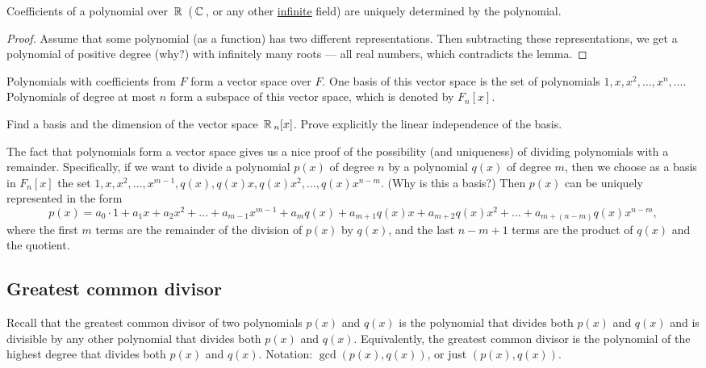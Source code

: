 \begin{corollary}
Coefficients of a polynomial over $\,\mathbb{R}\,$ ($\,\mathbb{C}\,$, or any other \underline{infinite} field) are uniquely determined by the polynomial.
\end{corollary}

\begin{proof}
Assume that some polynomial (as a function) has two different representations. Then subtracting these representations, we get a polynomial of positive degree (why?) with infinitely many roots --- all real numbers, which contradicts the lemma.
\end{proof}

Polynomials with coefficients from $F$ form a vector space over $F$. One basis of this vector space is the set of polynomials $1, x, x^2, \ldots, x^n, \ldots$. Polynomials of degree at most $n$ form a subspace of this vector space, which is denoted by $F_n[x]$.

\begin{exercise}
    Find a basis and the dimension of the vector space $\,\mathbb{R}\,_n[x]$. Prove explicitly the linear independence of the basis.
\end{exercise}

The fact that polynomials form a vector space gives us a nice proof of the possibility (and uniqueness) of dividing polynomials with a remainder. Specifically, if we want to divide a polynomial $p(x)$ of degree $n$ by a polynomial $q(x)$ of degree $m$, then we choose as a basis in $F_n[x]$ the set $1, x, x^2, \ldots, x^{m - 1}, q(x), q(x)x, q(x)x^2, \ldots, q(x)x^{n-m}$. (Why is this a basis?) Then $p(x)$ can be uniquely represented in the form 
$$p(x) = a_0 \cdot 1+ a_1x + a_2x^2 + \ldots + a_{m-1}x^{m - 1} + a_m q(x) + a_{m+1}q(x)x + a_{m+2} q(x)x^2+ \ldots+ a_{m + (n-m)} q(x)x^{n-m},
$$ where the first $m$ terms are the remainder of the division of $p(x)$ by $q(x)$, and the last $n-m+1$ terms are the product of $q(x)$ and the quotient.

\subsection{Greatest common divisor}

Recall that the greatest common divisor of two polynomials $p(x)$ and $q(x)$ is the polynomial that divides both $p(x)$ and $q(x)$ and is divisible by any other polynomial that divides both $p(x)$ and $q(x)$. Equivalently, the greatest common divisor is the polynomial of the highest degree that divides both $p(x)$ and $q(x)$. Notation: $\gcd(p(x), q(x))$, or just $(p(x), q(x))$.

